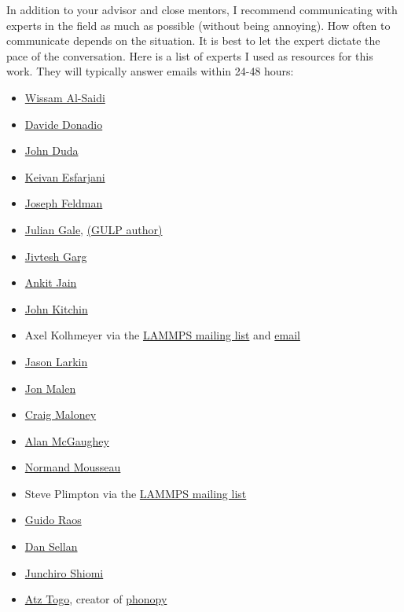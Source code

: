 In addition to your advisor and close mentors, 
I recommend communicating with experts in the field as much as 
possible (without being annoying).  How often to 
communicate depends on the situation. 
It is best to let the expert dictate the pace of the conversation. 
Here is a list of experts I used as resources for this work. They 
will typically answer emails within 24-48 hours:

\begin{itemize}
\item \href{http://www.engineering.pitt.edu/WissamAlSaidi/}
{Wissam Al-Saidi}
\item \href{http://www2.mpip-mainz.mpg.de/~donadio/tnt/People.html}
{Davide Donadio}
\item \href{http://johncduda.com/}
{John Duda}
\item \href{http://mech.rutgers.edu/content/keivan-esfarjani}
{Keivan Esfarjani}
\item \href{mailto:joseph.feldman.ctr@nrl.navy.mil}
{Joseph Feldman}
\item \href{http://chemistry.curtin.edu.au/people/academic.cfm/J.Gale}
{Julian Gale}, \href{http://projects.ivec.org/gulp/news.html}
{(GULP author)}
\item \href{http://quasiamore.mit.edu/pmwiki.php?n=Main.JivteshGarg}
{Jivtesh Garg}
\item \href{https://github.com/ankitjainmeiitk}
{Ankit Jain}
\item \href{https://github.com/jkitchin}
{John Kitchin}
\item Axel Kolhmeyer via the 
\href{http://lammps.sandia.gov/threads/threads.html}{LAMMPS mailing list} 
and \href{akohlmey@gmail.com}{email}
\item \href{http://jasonlarkin.github.io}{Jason Larkin}
\item \href{http://www.cmu.edu/me/malen/Lab_Website/People.html}
{Jon Malen}
\item \href{http://www.ce.cmu.edu/people/faculty/maloney.html}
{Craig Maloney}
\item \href{http://ntpl.me.cmu.edu/people.html}
{Alan McGaughey}
\item \href{http://www.pmc.umontreal.ca/~mousseau/site_an/}
{Normand Mousseau}
\item Steve Plimpton via the 
\href{http://lammps.sandia.gov/threads/threads.html}{LAMMPS mailing list} 
\item \href{http://www.chem.polimi.it/people/faculty/guido-raos/}
{Guido Raos}
\item \href{http://utexas.academia.edu/DanSellan}
{Dan Sellan}
\item \href{http://www.phonon.t.u-tokyo.ac.jp/}
{Junchiro Shiomi}
\item \href{http://atztogo.users.sourceforge.net/}{Atz Togo}, creator of 
\href{http://phonopy.sourceforge.net/}{phonopy}
\end{itemize}
